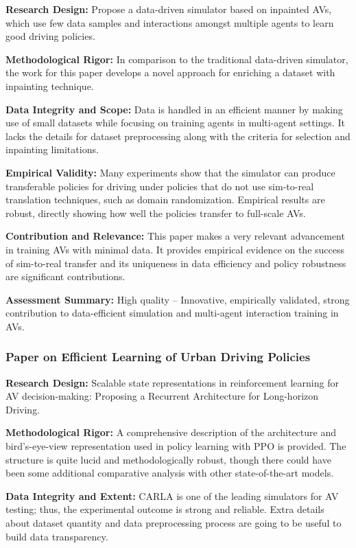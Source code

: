 \documentclass[lettersize,journal]{IEEEtran}
\begin{document}
\textbf{Research Design:} Propose a data-driven simulator based on inpainted AVs, which use few data samples and interactions amongst multiple agents to learn good driving policies.

\textbf{Methodological Rigor:} In comparison to the traditional data-driven simulator, the work for this paper develops a novel approach for enriching a dataset with inpainting technique.

\textbf{Data Integrity and Scope:} Data is handled in an efficient manner by making use of small datasets while focusing on training agents in multi-agent settings. It lacks the details for dataset preprocessing along with the criteria for selection and inpainting limitations.

\textbf{Empirical Validity:} Many experiments show that the simulator can produce transferable policies for driving under policies that do not use sim-to-real translation techniques, such as domain randomization. Empirical results are robust, directly showing how well the policies transfer to full-scale AVs.

\textbf{Contribution and Relevance:} This paper makes a very relevant advancement in training AVs with minimal data. It provides empirical evidence on the success of sim-to-real transfer and its uniqueness in data efficiency and policy robustness are significant contributions.

\textbf{Assessment Summary:} High quality – Innovative, empirically validated, strong contribution to data-efficient simulation and multi-agent interaction training in AVs.

\subsubsection{Paper on Efficient Learning of Urban Driving Policies \cite{ref59}}

\textbf{Research Design:} Scalable state representations in reinforcement learning for AV decision-making: Proposing a Recurrent Architecture for Long-horizon Driving.

\textbf{Methodological Rigor:} A comprehensive description of the architecture and bird's-eye-view representation used in policy learning with PPO is provided. The structure is quite lucid and methodologically robust, though there could have been some additional comparative analysis with other state-of-the-art models.

\textbf{Data Integrity and Extent:} CARLA is one of the leading simulators for AV testing; thus, the experimental outcome is strong and reliable. Extra details about dataset quantity and data preprocessing process are going to be useful to build data transparency.
\end{document}
